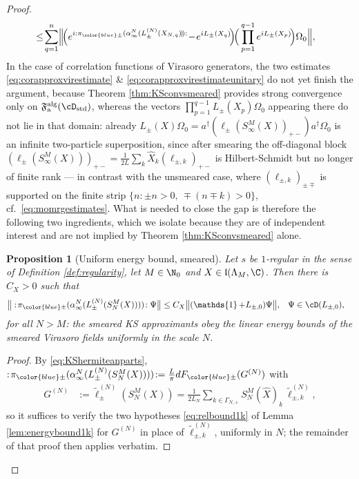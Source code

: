 \documentclass[a4paper, 11pt]{article}
\newcommand{\ua}{\textup a}
\newcommand{\fF}{\mathfrak{F}}\newcommand{\cF}{\mathcal{F}}\newcommand{\dF}{\mathds{F}}\newcommand{\sF}{\mathscr{F}}
\newcommand{\fl}{\mathfrak{l}}\newcommand{\cl}{\mathcal{l}}
\DeclareMathOperator{\1}{\mathds{1}}
\DeclareMathOperator{\std}{std}
\DeclareMathOperator{\alg}{alg}
\newtheorem{prop}[thm]{Proposition}
\begin{document}
\begin{proof}
\begin{align}
& \!\leq\!\sum^{n}_{q=1}\!\Big\|\!\Big(e^{i:\pi_{{\color{blue}\pm}}(\alpha^{N}_{\infty}(L^{(N)}_{\pm}(X_{N,q})\!)\!):}\!-\!e^{iL_{\pm}(X_{q})}\!\Big)\!\Big(\prod_{p=1}^{q-1}e^{iL_{\pm}(X_{p})}\!\Big)\Omega_{0}\Big\|,
\end{align}
In the case of correlation functions of Virasoro generators, the two estimates \eqref{eq:corapproxvirestimate} \& \eqref{eq:corapproxvirestimateunitary} do not yet finish the argument, because Theorem \ref{thm:KSconvsmeared} provides strong convergence only on $\fF^{\alg}_{\ua}(\cD_{\std})$, whereas the vectors $\prod_{p=1}^{q-1}L_{\pm}(X_{p})\Omega_{0}$ appearing there do not lie in that domain: already $L_{\pm}(X)\Omega_{0} = a^{\dagger}(\ell_{\pm}(S^{M}_{\infty}(X))_{+-})a^{\dagger}\Omega_{0}$ is an infinite two-particle superposition, since after smearing the off-diagonal block $(\ell_{\pm}(S^{M}_{\infty}(X)))_{+-} = \tfrac{1}{2L}\sum_{k}\hat{X}_{k}(\ell_{\pm,k})_{+-}$ is Hilbert-Schmidt but no longer of finite rank --- in contrast with the unsmeared case, where $(\ell_{\pm,k})_{\pm\mp}$ is supported on the finite strip $\{n:\pm n>0,\ \mp(n\mp k)>0\}$, cf.~\eqref{eq:momrgestimates}. What is needed to close the gap is therefore the following two ingredients, which we isolate because they are of independent interest and are not implied by Theorem \ref{thm:KSconvsmeared} alone.

\begin{prop}[Uniform energy bound, smeared]
\label{hyp:energybound}
Let $s$ be $1$-regular in the sense of Definition \ref{def:regularity}, let $M\in\N_{0}$ and $X\in\fl(\Lambda_{M},\C)$. Then there is $C_{X}>0$ such that
\begin{align}
\label{eq:energybound}
\big\|:\!\pi_{{\color{blue}\pm}}(\alpha^{N}_{\infty}(L^{(N)}_{\pm}(S^{M}_{N}(X))))\!:\Psi\big\| & \leq C_{X}\big\|(\1+L_{\pm,0})\Psi\big\|, & \Psi & \in\cD(L_{\pm,0}),
\end{align}
for all $N>M$: the smeared KS approximants obey the linear energy bounds of the smeared Virasoro fields \cite{BuchholzHaagDualityIn, CarpiOnTheUniqueness} \emph{uniformly in the scale $N$}.
\end{prop}
\begin{proof}
By \eqref{eq:KShermiteanparts}, $:\!\pi_{{\color{blue}\pm}}(\alpha^{N}_{\infty}(L^{(N)}_{\pm}(S^{M}_{N}(X))))\!: = \tfrac{L}{\pi}dF_{{\color{blue}\pm}}(G^{(N)})$ with
\begin{align*}
G^{(N)} & := \tilde{\ell}^{(N)}_{\pm}(S^{M}_{N}(X)) = \tfrac{1}{2L_{N}}\!\!\!\sum_{k\in\Gamma_{N,+}}\!\!\!S^{M}_{N}(\hat{X})_{k}\!\ \tilde{\ell}^{(N)}_{\pm,k},
\end{align*}
so it suffices to verify the two hypotheses \eqref{eq:relbound1k} of Lemma \ref{lem:energybound1k} for $G^{(N)}$ in place of $\tilde{\ell}^{(N)}_{\pm,k}$, uniformly in $N$; the remainder of that proof then applies verbatim.


\end{proof}
\end{proof}
\end{document}
